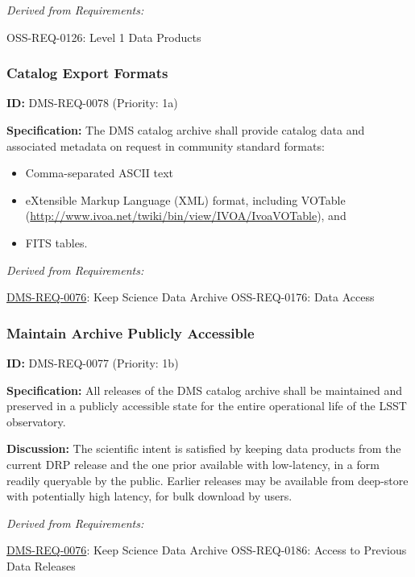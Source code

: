 \documentclass[SE,toc,lsstdraft]{lsstdoc}
\begin{document}
\emph{Derived from Requirements:}

OSS-REQ-0126:
Level 1 Data Products \newline

\subsubsection{Catalog Export Formats}

\label{DMS-REQ-0078}
\textbf{ID:} DMS-REQ-0078 (Priority: 1a)

\textbf{Specification:} The DMS catalog archive shall provide catalog data and associated metadata on request in community standard formats:
\begin{itemize}
\item Comma-separated ASCII text
\item eXtensible Markup Language (XML) format, including VOTable
   (\url{http://www.ivoa.net/twiki/bin/view/IVOA/IvoaVOTable}), and
\item FITS tables.
\end{itemize}

\emph{Derived from Requirements:}

\hyperref[DMS-REQ-0076]{DMS-REQ-0076}:
Keep Science Data Archive \newline
OSS-REQ-0176:
Data Access \newline

\subsubsection{Maintain Archive Publicly Accessible}

\label{DMS-REQ-0077}
\textbf{ID:} DMS-REQ-0077 (Priority: 1b)

\textbf{Specification: }All releases of the DMS catalog archive shall be maintained and preserved in a publicly accessible state for the entire operational life of the LSST observatory.

\textbf{Discussion:} The scientific intent is satisfied by keeping data products from the current DRP release and the one prior available with low-latency, in a form readily queryable by the public. Earlier releases may be available from deep-store with potentially high latency, for bulk download by users.

\emph{Derived from Requirements:}

\hyperref[DMS-REQ-0076]{DMS-REQ-0076}:
Keep Science Data Archive \newline
OSS-REQ-0186:
Access to Previous Data Releases \newline
\end{document}
